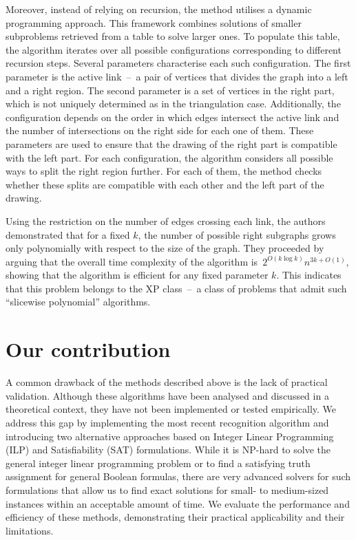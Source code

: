 Moreover, instead of relying on recursion, the method utilises a dynamic programming approach. This framework combines solutions of smaller subproblems retrieved from a table to solve larger ones. To populate this table, the algorithm iterates over all possible configurations corresponding to different recursion steps. Several parameters characterise each such configuration. The first parameter is the active link~--~a pair of vertices that divides the graph into a left and a right region. The second parameter is a set of vertices in the right part, which is not uniquely determined as in the triangulation case. Additionally, the configuration depends on the order in which edges intersect the active link and the number of intersections on the right side for each one of them. These parameters are used to ensure that the drawing of the right part is compatible with the left part. For each configuration, the algorithm considers all possible ways to split the right region further. For each of them, the method checks whether these splits are compatible with each other and the left part of the drawing.

Using the restriction on the number of edges crossing each link, the authors demonstrated that for a fixed \(k\), the number of possible right subgraphs grows only polynomially with respect to the size of the graph. They proceeded by arguing that the overall time complexity of the algorithm is~\(2^{O(k \log k)}n^{3k + O(1)}\), showing that the algorithm is efficient for any fixed parameter \(k\). This indicates that this problem belongs to the XP class~--~a class of problems that admit such ``slicewise polynomial'' algorithms.


\section{Our contribution}

A common drawback of the methods described above is the lack of practical validation. Although these algorithms have been analysed and discussed in a theoretical context, they have not been implemented or tested empirically. We address this gap by implementing the most recent recognition algorithm and introducing two alternative approaches based on Integer Linear Programming (ILP) and Satisfiability (SAT) formulations. While it is NP-hard to solve the general integer linear programming problem or to find a satisfying truth assignment for general Boolean formulas, there are very advanced solvers for such formulations that allow us to find exact solutions for small- to medium-sized instances within an acceptable amount of time. We evaluate the performance and efficiency of these methods, demonstrating their practical applicability and their limitations.
